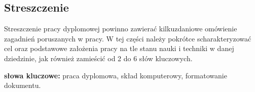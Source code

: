 \subsection*{Streszczenie}

Streszczenie pracy dyplomowej powinno zawierać kilkuzdaniowe omówienie zagadnień poruszanych w pracy. W tej części  należy pokrótce scharakteryzować cel oraz podstawowe założenia pracy na tle stanu nauki i techniki w danej dziedzinie, jak również zamieścić od 2 do 6 słów kluczowych.



\vspace{1cm}
\noindent\textbf{słowa kluczowe:} praca dyplomowa, skład komputerowy, formatowanie dokumentu.